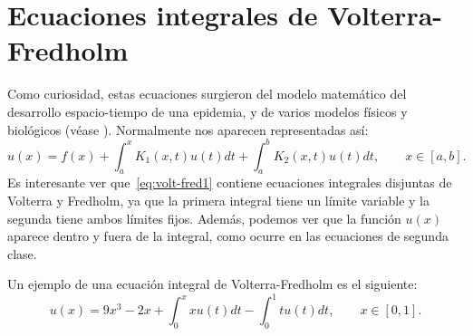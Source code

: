 \section{Ecuaciones integrales de Volterra-Fredholm}
Como curiosidad, estas ecuaciones surgieron del modelo matemático del desarrollo espacio-tiempo de una epidemia, y de varios modelos físicos y biológicos (véase \cite{WazWaz}). Normalmente nos aparecen representadas así:
\begin{equation}\label{eq:volt-fred1}
	u(x) = f(x) + \int_a^x K_1(x,t)u(t)dt + \int_a^b K_2(x,t)u(t)dt, \qquad x \in [a,b].
\end{equation}
Es interesante ver que~\eqref{eq:volt-fred1} contiene ecuaciones integrales disjuntas de Volterra y Fredholm, ya que la primera integral tiene un límite variable y la segunda tiene ambos límites fijos. Además, podemos ver que la función $u(x)$ aparece dentro y fuera de la integral, como ocurre en las ecuaciones de segunda clase.
\begin{ejemplo}
	Un ejemplo de una ecuación integral de Volterra-Fredholm es el siguiente:
	\begin{equation}\label{}
		u(x) = 9x^3 - 2x + \int_0^x xu(t)dt - \int_{0}^1 tu(t)dt, \qquad x \in [0,1].
	\end{equation}
\end{ejemplo}

\endinput